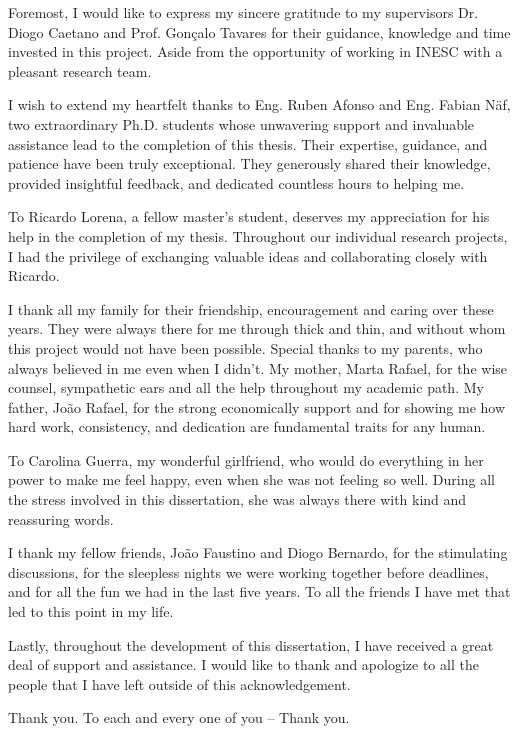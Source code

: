 
Foremost, I would like to express my sincere gratitude to my supervisors Dr. Diogo Caetano and Prof. Gonçalo Tavares for their guidance, knowledge and time invested in this project. Aside from the opportunity of working in INESC with a pleasant research team.

I wish to extend my heartfelt thanks to Eng. Ruben Afonso and Eng. Fabian Näf, two extraordinary Ph.D. students whose unwavering support and invaluable assistance lead to the completion of this thesis. Their expertise, guidance, and patience have been truly exceptional. They generously shared their knowledge, provided insightful feedback, and dedicated countless hours to helping me.

To Ricardo Lorena, a fellow master's student, deserves my appreciation for his help in the completion of my thesis. Throughout our individual research projects, I had the privilege of exchanging valuable ideas and collaborating closely with Ricardo.

I thank all my family for their friendship, encouragement and caring over these years. They were always there for me through thick and thin, and without whom this project would not have been possible. Special thanks to my parents, who always believed in me even when I didn't. My mother, Marta Rafael, for the wise counsel, sympathetic ears and all the help throughout my academic path. My father, João Rafael, for the strong economically support and for showing me how hard work, consistency, and dedication are fundamental traits for any human.

To Carolina Guerra, my wonderful girlfriend, who would do everything in her power to make me feel happy, even when she was not feeling so well. During all the stress involved in this dissertation, she was always there with kind and reassuring words.

I thank my fellow friends, João Faustino and Diogo Bernardo, for the stimulating discussions, for the sleepless nights we were working together before deadlines, and for all the fun we had in the last five years. To all the friends I have met that led to this point in my life.

Lastly, throughout the development of this dissertation, I have received a great deal of support and assistance. I would like to thank and apologize to all the people that I have left outside of this acknowledgement.

\begin{flushright}
Thank you. To each and every one of you -- Thank you.
\end{flushright}


